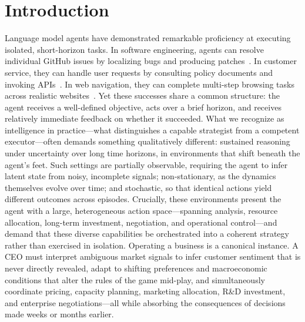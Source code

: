 \section{Introduction}

Language model agents have demonstrated remarkable proficiency at executing isolated, short-horizon tasks.
In software engineering, agents can resolve individual GitHub issues by localizing bugs and producing patches~\citep{jimenez2024swebench}.
In customer service, they can handle user requests by consulting policy documents and invoking APIs~\citep{yao2024taubench}.
In web navigation, they can complete multi-step browsing tasks across realistic websites~\citep{zhou2024webarena}.
Yet these successes share a common structure: the agent receives a well-defined objective, acts over a brief horizon, and receives relatively immediate feedback on whether it succeeded.
%
What we recognize as intelligence in practice---what distinguishes a capable strategist from a competent executor---often demands something qualitatively different: sustained reasoning under uncertainty over long time horizons, in environments that shift beneath the agent's feet.
%
Such settings are partially observable, requiring the agent to infer latent state from noisy, incomplete signals; non-stationary, as the dynamics themselves evolve over time; and stochastic, so that identical actions yield different outcomes across episodes.
%
Crucially, these environments present the agent with a large, heterogeneous action space---spanning analysis, resource allocation, long-term investment, negotiation, and operational control---and demand that these diverse capabilities be orchestrated into a coherent strategy rather than exercised in isolation.
%
Operating a business is a canonical instance.
A CEO must interpret ambiguous market signals to infer customer sentiment that is never directly revealed, adapt to shifting preferences and macroeconomic conditions that alter the rules of the game mid-play, and simultaneously coordinate pricing, capacity planning, marketing allocation, R\&D investment, and enterprise negotiations---all while absorbing the consequences of decisions made weeks or months earlier.

